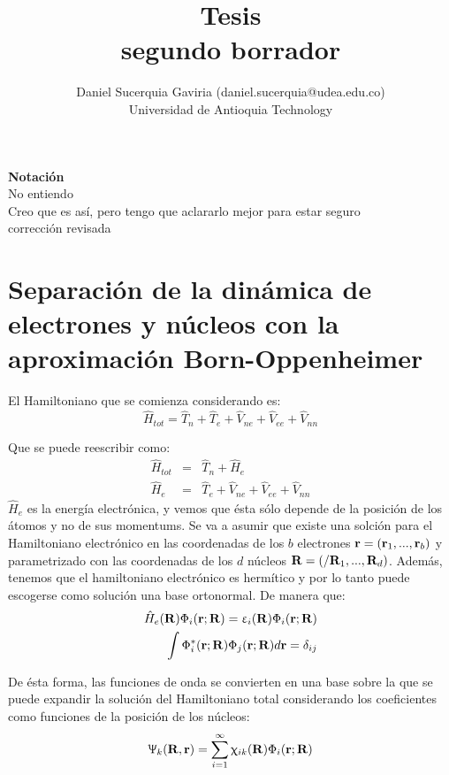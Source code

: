 \documentclass [11pt]{article}
\title{Tesis \\\medskip segundo borrador}
\author{Daniel Sucerquia Gaviria (daniel.sucerquia@udea.edu.co)\\Universidad de Antioquia Technology}
\begin{document}
\maketitle

{\Large \bf Notación}\\

{\color{red} No entiendo}\\
{\color{blue} Creo que es así, pero tengo que aclararlo mejor para estar
seguro}\\
{\color{Brown} corrección revisada}
\section{Separación de la dinámica de electrones y núcleos con la aproximación Born-Oppenheimer}
El Hamiltoniano que se comienza considerando es:
\begin{equation}
    {\hat H}_{tot}={\hat T}_n+{\hat T}_e+{\hat V}_{ne}+{\hat V}_{ee}+{\hat V}_{nn}
\end{equation}

Que se puede reescribir como:
\begin{eqnarray}
    {\hat H}_{tot} & =  & {\hat T}_n+{\hat H}_e\\
    {\hat H}_e & = & {\hat T}_e+{\hat V}_{ne}+{\hat V}_{ee}+{\hat V}_{nn}
\end{eqnarray}
$\hat H_e $ es la energía electrónica, y vemos que ésta sólo depende de la posición de los átomos y no de sus momentums. Se va a asumir que existe una solción para el Hamiltoniano electrónico  en las coordenadas de los $b$ electrones ${\bf r}=({\bf r}_1,...,{\bf r}_b)$ y parametrizado con las coordenadas de los $d$ núcleos ${\bf R}=(/{\bf R}_1,...,{\bf R}_d)$. Además, tenemos que el hamiltoniano electrónico es hermítico y por lo tanto puede escogerse como solución una base ortonormal. De manera que:  
\begin{eqnarray}
    {\hat H}_e({\bf R}) \Phi_i({\bf r};{\bf R})=\upvarepsilon_i({\bf R}) \Phi_i({\bf r};{\bf R})\\
    \int \Phi_i^*({\bf r};{\bf R})\Phi_j({\bf r};{\bf R})d{\bf r}=\delta_{ij}
\end{eqnarray}

De ésta forma, las funciones de onda se convierten en una base sobre la que se puede expandir la solución del Hamiltoniano total considerando los coeficientes como funciones de la posición de los núcleos:
\begin{equation}
    \Uppsi_k({\bf R},{\bf r})=\sum_{i=1}^{\infty}\upchi_{ik}({\bf R})\Phi_i({\bf r};{\bf R})
\end{equation}
\end{document}
